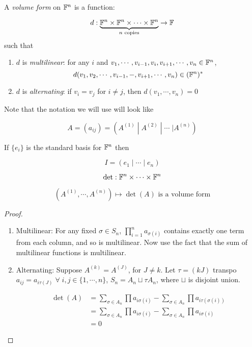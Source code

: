 \documentclass[a4paper]{article}
\begin{document}
\begin{defi}
	A \emph{volume form} on $ \mathbb{F}^{n} $ is a function:
	
	\[ d : \underbrace{\mathbb{F}^{n} \times \mathbb{F}^{n} \times \cdots \times \mathbb{F}^{n}}_{n \text{ copies}} \to \mathbb{F}  \] such that
	
	\begin{enumerate}
		\item $ d $ is \emph{multilinear}: for any $ i $ and $ v_{1},\cdots,v_{i-1},v_{i},v_{i+1},\cdots,v_{n} \in \mathbb{F}^{n} $, \[ d(v_{1},v_{2},\cdots,v_{i-1},-,v_{i+1},\cdots,v_{n}) \in (\mathbb{F}^{n})^{*} \]
		\item $ d $ is \emph{alternating}: if $ v_{i} = v_{j} $ for $ i \neq j $, then $ d(v_{1},\cdots,v_{n}) = 0$
		
	\end{enumerate}
\end{defi}

Note that the notation we will use will look like

\[ A = (a_{ij}) = (A^{(1)} \; | \; A^{(2)} \; | \; \cdots \; | A^{(n)}   ) \]

If $ \{ e_{i} \} $ is the standard basis for $ \mathbb{F}^{n} $ then 

\[ I = (  e_{1} \; | \; \cdots \; | \; e_{n} ) \]


\begin{lemma} 
	\[ \det : \mathbb{F}^{n} \times \cdots \times \mathbb{F}^{n} \]
	
	\[ (A^{(1)},\cdots,A^{(n)} ) \mapsto \det (A) \text{ is a volume form} \]
	
\end{lemma}


\begin{proof}
	\begin{enumerate}
		\item Multilinear: For any fixed $ \sigma \in S_{n} $, $ \prod_{i=1}^{n} a_{\sigma(i)} $ contains exactly one term from each column, and so is multilinear. Now use the fact that the sum of multilinear functions is multilinear. 
		
		\item Alternating: Suppose $ A^{(k)} = A^{(J)} $, for $ J \neq k $. Let $ \tau = (k J) $ transpo $ a_{ij} = a_{i \tau(J)} \; \forall \; i,j \in \{ 1,\cdots,n \}$, $ S_{n} = A_{n} \sqcup \tau A_{n} $, where $ \sqcup $ is disjoint union. 
		
		\begin{align*}
		\det(A) & = \sum_{\sigma \in A_{n}} \prod a_{i\sigma(i)} - \sum_{\sigma \in A_{n}} \prod a_{i  \tau(\sigma(i))  } \\
		& = \sum_{\sigma \in A_{n}} \prod a_{i\sigma(i)} - \sum_{\sigma \in A_{n}} \prod a_{i\sigma(i)}\\
		& = 0
		\end{align*}
		
	\end{enumerate}
\end{proof}
\end{document}
